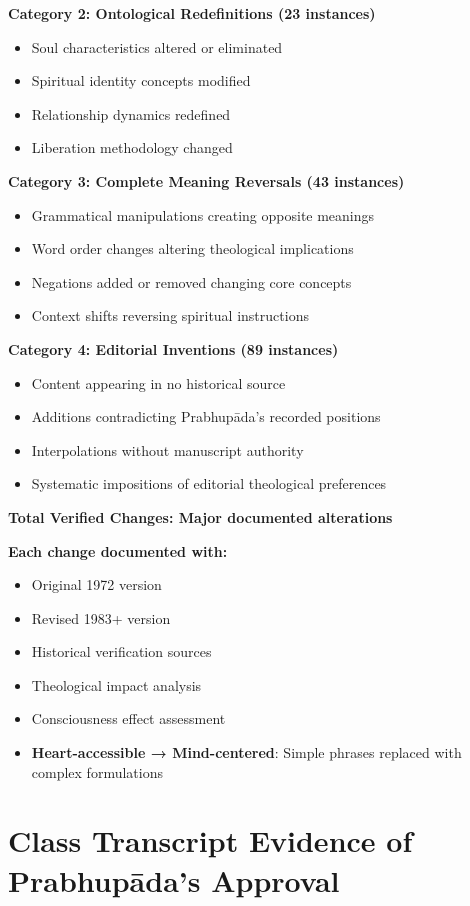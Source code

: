 \documentclass[11pt,twoside]{book}
\begin{document}
\textbf{\textbf{Category 2: Ontological Redefinitions (23 instances)}}
\begin{itemize}
\item Soul characteristics altered or eliminated
\item Spiritual identity concepts modified
\item Relationship dynamics redefined
\item Liberation methodology changed
\end{itemize}

\textbf{\textbf{Category 3: Complete Meaning Reversals (43 instances)}}
\begin{itemize}
\item Grammatical manipulations creating opposite meanings
\item Word order changes altering theological implications
\item Negations added or removed changing core concepts
\item Context shifts reversing spiritual instructions
\end{itemize}

\textbf{\textbf{Category 4: Editorial Inventions (89 instances)}}
\begin{itemize}
\item Content appearing in no historical source
\item Additions contradicting Prabhupāda's recorded positions
\item Interpolations without manuscript authority
\item Systematic impositions of editorial theological preferences
\end{itemize}

\textbf{\textbf{Total Verified Changes: Major documented alterations}}

\textbf{Each change documented with:}
\begin{itemize}
\item Original 1972 version
\item Revised 1983+ version
\item Historical verification sources
\item Theological impact analysis
\item Consciousness effect assessment
\item \textbf{\textbf{Heart-accessible → Mind-centered}}: Simple phrases replaced with complex formulations
\end{itemize}
\section*{Class Transcript Evidence of Prabhupāda's Approval}
\label{sec:org7ac177a}
\end{document}
